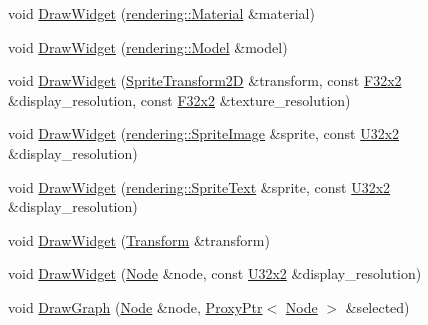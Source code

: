 \begin{DoxyCompactItemize}
\item 
void \mbox{\hyperlink{namespacemage_1_1script_1_1anonymous__namespace_02editor__script_8cpp_03_a5e0761853945b8519c6b8f39b888420a}{Draw\+Widget}} (\mbox{\hyperlink{classmage_1_1rendering_1_1_material}{rendering\+::\+Material}} \&material)
\item 
void \mbox{\hyperlink{namespacemage_1_1script_1_1anonymous__namespace_02editor__script_8cpp_03_a92235da8a7035a003232bf76ec407859}{Draw\+Widget}} (\mbox{\hyperlink{classmage_1_1rendering_1_1_model}{rendering\+::\+Model}} \&model)
\item 
void \mbox{\hyperlink{namespacemage_1_1script_1_1anonymous__namespace_02editor__script_8cpp_03_a843b325e370e28531d7ec0274108c24a}{Draw\+Widget}} (\mbox{\hyperlink{classmage_1_1_sprite_transform2_d}{Sprite\+Transform2D}} \&transform, const \mbox{\hyperlink{namespacemage_aee4759dedc8def6c6dec26b5c7eddf29}{F32x2}} \&display\+\_\+resolution, const \mbox{\hyperlink{namespacemage_aee4759dedc8def6c6dec26b5c7eddf29}{F32x2}} \&texture\+\_\+resolution)
\item 
void \mbox{\hyperlink{namespacemage_1_1script_1_1anonymous__namespace_02editor__script_8cpp_03_aa6702e2ff1562afadf04c8388556234d}{Draw\+Widget}} (\mbox{\hyperlink{classmage_1_1rendering_1_1_sprite_image}{rendering\+::\+Sprite\+Image}} \&sprite, const \mbox{\hyperlink{namespacemage_ae5e7ccf8a1785baaacf57b3a0f4324e2}{U32x2}} \&display\+\_\+resolution)
\item 
void \mbox{\hyperlink{namespacemage_1_1script_1_1anonymous__namespace_02editor__script_8cpp_03_a0912159675030c89ea49f8d96579e0f6}{Draw\+Widget}} (\mbox{\hyperlink{classmage_1_1rendering_1_1_sprite_text}{rendering\+::\+Sprite\+Text}} \&sprite, const \mbox{\hyperlink{namespacemage_ae5e7ccf8a1785baaacf57b3a0f4324e2}{U32x2}} \&display\+\_\+resolution)
\item 
void \mbox{\hyperlink{namespacemage_1_1script_1_1anonymous__namespace_02editor__script_8cpp_03_ac4b2588b097f97cf3d9bf6bbec7938ba}{Draw\+Widget}} (\mbox{\hyperlink{classmage_1_1_transform}{Transform}} \&transform)
\item 
void \mbox{\hyperlink{namespacemage_1_1script_1_1anonymous__namespace_02editor__script_8cpp_03_aa6f57f0880bb438f22ff63bde8522518}{Draw\+Widget}} (\mbox{\hyperlink{classmage_1_1_node}{Node}} \&node, const \mbox{\hyperlink{namespacemage_ae5e7ccf8a1785baaacf57b3a0f4324e2}{U32x2}} \&display\+\_\+resolution)
\item 
void \mbox{\hyperlink{namespacemage_1_1script_1_1anonymous__namespace_02editor__script_8cpp_03_a0e1c1d61b369a6c6eee68380890d5217}{Draw\+Graph}} (\mbox{\hyperlink{classmage_1_1_node}{Node}} \&node, \mbox{\hyperlink{classmage_1_1_proxy_ptr}{Proxy\+Ptr}}$<$ \mbox{\hyperlink{classmage_1_1_node}{Node}} $>$ \&selected)

\end{DoxyCompactItemize}
